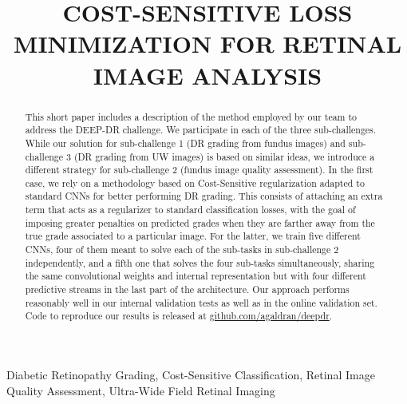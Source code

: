 \documentclass{article}
\title{COST-SENSITIVE LOSS MINIMIZATION FOR RETINAL IMAGE ANALYSIS}
\begin{document}
%
\maketitle
%
\begin{abstract}
This short paper includes a description of the method employed by our team to address the DEEP-DR challenge. 
We participate in each of the three sub-challenges.
While our solution for sub-challenge 1 (DR grading from fundus images) and sub-challenge 3 (DR grading from UW images) is based on similar ideas, we introduce a different strategy for sub-challenge 2 (fundus image quality assessment). 
In the first case, we rely on a methodology based on Cost-Sensitive regularization adapted to standard CNNs for better performing DR grading. 
This consists of attaching an extra term that acts as a regularizer to standard classification losses, with the goal of imposing greater penalties on predicted grades when they are farther away from the true grade associated to a particular image.
For the latter, we train five different CNNs, four of them meant to solve each of the sub-tasks in sub-challenge 2 independently, and a fifth one that solves the four sub-tasks simultaneously, sharing the same convolutional weights and internal representation but with four different predictive streams in the last part of the architecture.
Our approach performs reasonably well in our internal validation tests as well as in the online validation set. 
Code to reproduce our results is released at \url{github.com/agaldran/deepdr}.
\end{abstract}
%
\begin{keywords}
Diabetic Retinopathy Grading, Cost-Sensitive Classification, Retinal Image Quality Assessment, Ultra-Wide Field Retinal Imaging
\end{keywords}






%
%
%

%


%


%
%

\end{document}
